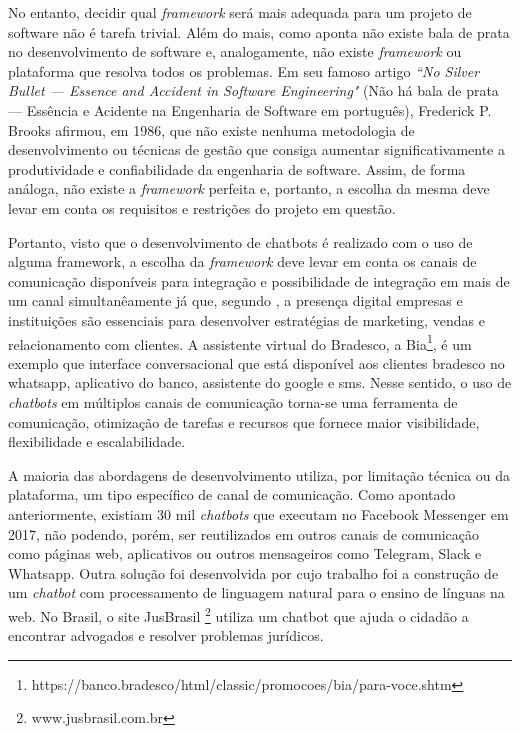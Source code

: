 No entanto, decidir qual \textit{framework} será mais adequada  para um projeto de software não é tarefa trivial. Além do mais, como aponta  não existe bala de prata no desenvolvimento de software e, analogamente, não existe \textit{framework} ou plataforma que resolva todos os problemas. Em seu famoso artigo \textit{“No Silver Bullet — Essence and Accident in Software Engineering"} (Não há bala de prata — Essência e Acidente na Engenharia de Software em português), Frederick P. Brooks afirmou, em 1986, que não existe nenhuma metodologia de desenvolvimento ou técnicas de gestão que consiga aumentar significativamente a produtividade e confiabilidade da engenharia de software. Assim, de forma análoga, não existe a \textit{framework} perfeita e, portanto, a escolha da mesma deve levar em conta os requisitos e restrições do projeto em questão. 





Portanto, visto que o desenvolvimento de chatbots é realizado com o uso de alguma framework, a escolha da \textit{framework} deve levar em conta os canais de comunicação disponíveis para integração e possibilidade de integração em mais de um canal simultanêamente já que, segundo , a presença digital empresas e instituições são essenciais para desenvolver estratégias de marketing, vendas e relacionamento com clientes. A assistente virtual do Bradesco, a Bia\footnote{https://banco.bradesco/html/classic/promocoes/bia/para-voce.shtm}, é um exemplo que interface conversacional que está disponível aos clientes bradesco no whatsapp, aplicativo do banco, assistente do google e sms.  Nesse sentido, o uso de \textit{chatbots} em múltiplos canais de comunicação torna-se uma ferramenta de comunicação, otimização de tarefas e recursos que fornece maior visibilidade, flexibilidade e escalabilidade. 


A maioria das abordagens de desenvolvimento utiliza, por limitação técnica ou da plataforma, um tipo específico de canal de comunicação. Como apontado anteriormente, existiam 30 mil \textit{chatbots} que executam no Facebook Messenger em 2017, não podendo, porém, ser reutilizados em outros canais de comunicação como páginas web, aplicativos ou outros mensageiros como Telegram, Slack e Whatsapp. Outra solução foi desenvolvida por  cujo trabalho foi a construção de um \textit{chatbot} com processamento de linguagem natural para o ensino de línguas na web. No Brasil, o site JusBrasil \footnote{www.jusbrasil.com.br} utiliza um chatbot que ajuda o cidadão a encontrar advogados e resolver problemas jurídicos. 


